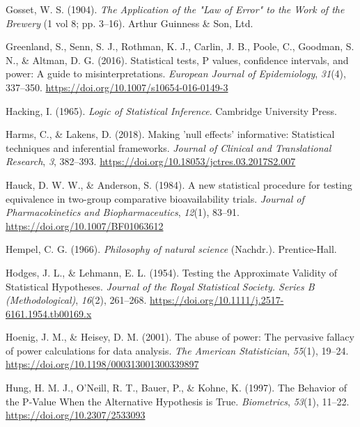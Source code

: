 \documentclass[
  letterpaper,
  DIV=11,
  numbers=noendperiod]{scrreprt}
\newlength{\cslhangindent}
\newlength{\cslentryspacingunit} %
\newenvironment{CSLReferences}[2] %
 {%
  \setlength{\parindent}{0pt}
  \ifodd #1
  \let\oldpar\par
  \def\par{\hangindent=\cslhangindent\oldpar}
  \fi
  \setlength{\parskip}{#2\cslentryspacingunit}
 }%
 {}
\begin{document}
\begin{CSLReferences}{1}{0}
\leavevmode{}%
Gosset, W. S. (1904). \emph{The {Application} of the "{Law} of {Error}"
to the {Work} of the {Brewery}} (1 vol 8; pp. 3--16). {Arthur Guinness
\& Son, Ltd.}

\leavevmode{}%
Greenland, S., Senn, S. J., Rothman, K. J., Carlin, J. B., Poole, C.,
Goodman, S. N., \& Altman, D. G. (2016). Statistical tests, {P} values,
confidence intervals, and power: A guide to misinterpretations.
\emph{European Journal of Epidemiology}, \emph{31}(4), 337--350.
\url{https://doi.org/10.1007/s10654-016-0149-3}

\leavevmode{}%
Hacking, I. (1965). \emph{Logic of {Statistical Inference}}. {Cambridge
University Press}.

\leavevmode{}%
Harms, C., \& Lakens, D. (2018). Making 'null effects' informative:
Statistical techniques and inferential frameworks. \emph{Journal of
Clinical and Translational Research}, \emph{3}, 382--393.
\url{https://doi.org/10.18053/jctres.03.2017S2.007}

\leavevmode{}%
Hauck, D. W. W., \& Anderson, S. (1984). A new statistical procedure for
testing equivalence in two-group comparative bioavailability trials.
\emph{Journal of Pharmacokinetics and Biopharmaceutics}, \emph{12}(1),
83--91. \url{https://doi.org/10.1007/BF01063612}

\leavevmode{}%
Hempel, C. G. (1966). \emph{Philosophy of natural science} (Nachdr.).
{Prentice-Hall}.

\leavevmode{}%
Hodges, J. L., \& Lehmann, E. L. (1954). Testing the {Approximate
Validity} of {Statistical Hypotheses}. \emph{Journal of the Royal
Statistical Society. Series B (Methodological)}, \emph{16}(2), 261--268.
\url{https://doi.org/10.1111/j.2517-6161.1954.tb00169.x}

\leavevmode{}%
Hoenig, J. M., \& Heisey, D. M. (2001). The abuse of power: The
pervasive fallacy of power calculations for data analysis. \emph{The
American Statistician}, \emph{55}(1), 19--24.
\url{https://doi.org/10.1198/000313001300339897}

\leavevmode{}%
Hung, H. M. J., O'Neill, R. T., Bauer, P., \& Kohne, K. (1997). The
{Behavior} of the {P-Value When} the {Alternative Hypothesis} is {True}.
\emph{Biometrics}, \emph{53}(1), 11--22.
\url{https://doi.org/10.2307/2533093}


\end{CSLReferences}
\end{document}
